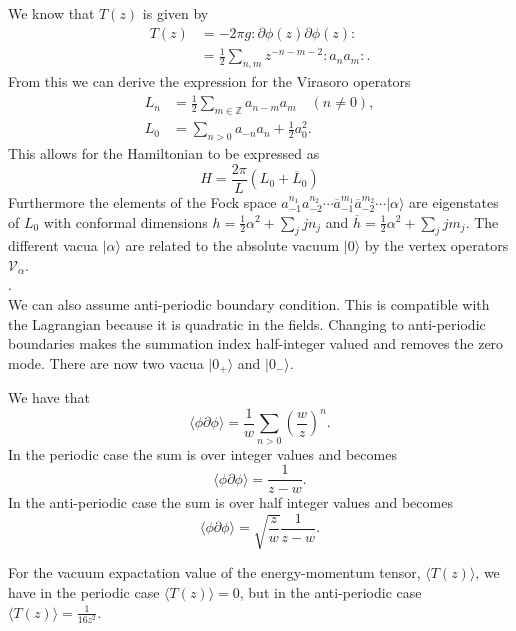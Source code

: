 \documentclass[submission, PhysLectNotes]{SciPost}
\begin{document}
We know that $T(z)$ is given by
\begin{align}
  T(z) &= -2\pi g :\partial \phi(z) \partial\phi(z) :\\
  &= \frac{1}{2} \sum_{n,m}z^{-n-m-2}:a_n a_m: .
\end{align}
From this we can derive the expression for the Virasoro operators
\begin{align}
  L_n &= \frac{1}{2}\sum_{m\in\mathbb{Z}}a_{n-m}a_m \quad(n\neq 0),\\
  L_0 &= \sum_{n>0}a_{-n}a_n + \frac{1}{2}a_0^2.
\end{align}
This allows for the Hamiltonian to be expressed as
\begin{equation}
  H = \frac{2\pi}{L}(L_0+\overline{L}_0)
\end{equation}
Furthermore the elements of the Fock space $a_{-1}^{n_1}a_{-2}^{n_2}\cdots \overline{a}_{-1}^{m_1}\overline{a}_{-2}^{m_2}\cdots \lvert\alpha\rangle$ are eigenstates of $L_0$ with conformal dimensions $h=\frac{1}{2}\alpha^2+\sum_j j n_j$ and $\overline{h}=\frac{1}{2}\alpha^2+\sum_j j m_j$.
The different vacua $\lvert \alpha\rangle$ are related to the absolute vacuum $\lvert 0\rangle$ by the vertex operators $\mathcal{V}_\alpha$.\\

.\\
We can also assume anti-periodic boundary condition. This is compatible with the Lagrangian because it is quadratic in the fields. Changing to anti-periodic boundaries makes the summation index half-integer valued and removes the zero mode. There are now two vacua $\lvert 0_+ \rangle$ and $\lvert 0_- \rangle$.

We have that
\begin{equation}
    \langle\phi\partial\phi\rangle = \frac{1}{w}\sum_{n>0}{\left(\frac{w}{z}\right)}^n.
\end{equation}
In the periodic case the sum is over integer values and becomes
\begin{equation}
  \langle\phi\partial\phi\rangle = \frac{1}{z-w}.
\end{equation}
In the anti-periodic case the sum is over half integer values and becomes
\begin{equation}
  \langle\phi\partial\phi\rangle = \sqrt{\frac{z}{w}}\frac{1}{z-w}.
\end{equation}

For the vacuum expactation value of the energy-momentum tensor, $\langle T(z)\rangle$, we have in the periodic case $\langle T(z)\rangle = 0$, but in the anti-periodic case $\langle T(z)\rangle=\frac{1}{16z^2}$.\\
\end{document}
